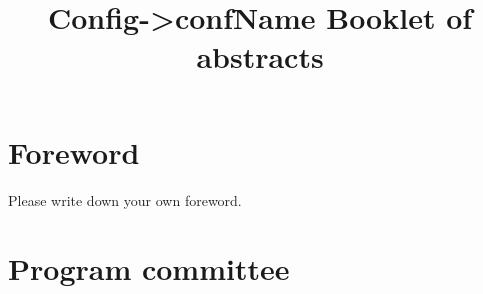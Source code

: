 \documentclass{book}
\begin{document}
\title{ \textbf{{Config->confName} 
\linebreak
\vspace*{1cm}
 Booklet of abstracts}}
\author{}
\date{\empty}

\maketitle

\tableofcontents

\chapter*{Foreword}

Please write down your own foreword.

\chapter*{Program committee}
\begin{multicols}{2}

\end{multicols}
% 
% 




\printindex[authors]
\end{document}
